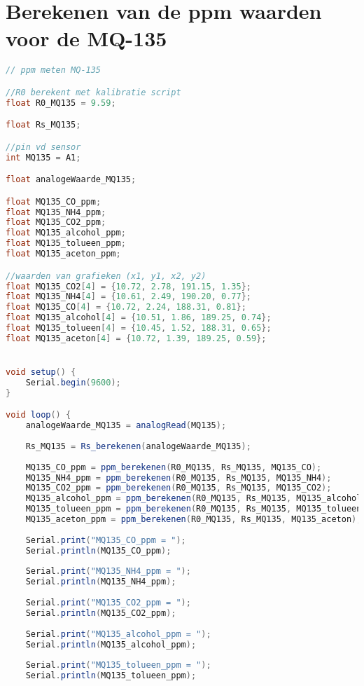 \section{Berekenen van de ppm waarden voor de MQ-135}
\label{lst:ppm_mq135}
\begin{lstlisting}[language=Java, caption={Berekenen van de ppm waarden voor de MQ-135}]
// ppm meten MQ-135

//R0 berekent met kalibratie script
float R0_MQ135 = 9.59;

float Rs_MQ135;

//pin vd sensor 
int MQ135 = A1;

float analogeWaarde_MQ135;

float MQ135_CO_ppm;
float MQ135_NH4_ppm;
float MQ135_CO2_ppm;
float MQ135_alcohol_ppm;
float MQ135_tolueen_ppm;
float MQ135_aceton_ppm;

//waarden van grafieken (x1, y1, x2, y2)
float MQ135_CO2[4] = {10.72, 2.78, 191.15, 1.35};
float MQ135_NH4[4] = {10.61, 2.49, 190.20, 0.77};
float MQ135_CO[4] = {10.72, 2.24, 188.31, 0.81};
float MQ135_alcohol[4] = {10.51, 1.86, 189.25, 0.74};
float MQ135_tolueen[4] = {10.45, 1.52, 188.31, 0.65};
float MQ135_aceton[4] = {10.72, 1.39, 189.25, 0.59};


void setup() {
    Serial.begin(9600);
}

void loop() {
    analogeWaarde_MQ135 = analogRead(MQ135);
    
    Rs_MQ135 = Rs_berekenen(analogeWaarde_MQ135);
    
    MQ135_CO_ppm = ppm_berekenen(R0_MQ135, Rs_MQ135, MQ135_CO);
    MQ135_NH4_ppm = ppm_berekenen(R0_MQ135, Rs_MQ135, MQ135_NH4);
    MQ135_CO2_ppm = ppm_berekenen(R0_MQ135, Rs_MQ135, MQ135_CO2);
    MQ135_alcohol_ppm = ppm_berekenen(R0_MQ135, Rs_MQ135, MQ135_alcohol);
    MQ135_tolueen_ppm = ppm_berekenen(R0_MQ135, Rs_MQ135, MQ135_tolueen);
    MQ135_aceton_ppm = ppm_berekenen(R0_MQ135, Rs_MQ135, MQ135_aceton);
    
    Serial.print("MQ135_CO_ppm = ");
    Serial.println(MQ135_CO_ppm);
    
    Serial.print("MQ135_NH4_ppm = ");
    Serial.println(MQ135_NH4_ppm);
    
    Serial.print("MQ135_CO2_ppm = ");
    Serial.println(MQ135_CO2_ppm);
    
    Serial.print("MQ135_alcohol_ppm = ");
    Serial.println(MQ135_alcohol_ppm);
    
    Serial.print("MQ135_tolueen_ppm = ");
    Serial.println(MQ135_tolueen_ppm);
    

\end{lstlisting}

